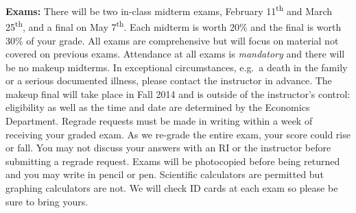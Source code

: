 \documentclass[11pt, letterpaper]{article}
\begin{document}
 \noindent \textbf{Exams:} There will be two in-class midterm exams, February 11\textsuperscript{th} and March 25\textsuperscript{th}, and a final on May 7\textsuperscript{th}. Each midterm is worth 20\% and the final is worth 30\% of your grade. All exams are comprehensive but will focus on material not covered on previous exams. Attendance at all exams is \emph{mandatory} and there will be no makeup midterms. In exceptional circumstances, e.g.\ a death in the family or a serious documented illness, please contact the instructor in advance. The makeup final will take place in Fall 2014 and is outside of the instructor's control: eligibility as well as the time and date are determined by the Economics Department. Regrade requests must be made in writing within a week of receiving your graded exam. As we re-grade the entire exam, your score could rise or fall. You may not discuss your answers with an RI or the instructor before submitting a regrade request. Exams will be photocopied before being returned and you may write in pencil or pen. Scientific calculators are permitted but graphing calculators are not. We will check ID cards at each exam so please be sure to bring yours. 



\newpage


\end{document}
